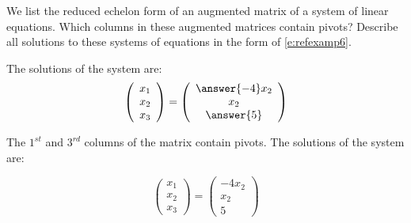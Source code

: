 \documentclass{ximera}
\begin{document}
\problemlabel

\noindent We list the reduced echelon form of an augmented matrix of a system of linear equations.  Which columns in these augmented matrices contain pivots?  Describe all solutions to these systems of equations in the form of \eqref{e:refexamp6}.

     \begin{exercise}
       The solutions of the system are:
\[
\left(\begin{array}{r} x_1 \\ x_2 \\ x_3\end{array} \right)
= \left(\begin{array}{c} \answer{-4}x_2 \\ x_2 \\ \answer{5}\end{array} \right)
\]

\begin{solution}
The $1^{st}$ and $3^{rd}$ columns of the matrix contain
pivots.  The solutions of the system are:

\[
\left(\begin{array}{r} x_1 \\ x_2 \\ x_3\end{array} \right)
= \left(\begin{array}{c} -4x_2 \\ x_2 \\ 5\end{array} \right)
\]

\end{solution}
     \end{exercise}

\problemlabel
\end{document}
